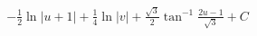 \documentclass[preview]{standalone}
\begin{document}
\begin{align*}
-\frac{1}{2}\ln|u+1|+\frac{1}{4}\ln|v|+\frac{\sqrt3}{2}\tan^{-1}\frac{2u-1}{\sqrt3}+C
\end{align*}
\end{document}

